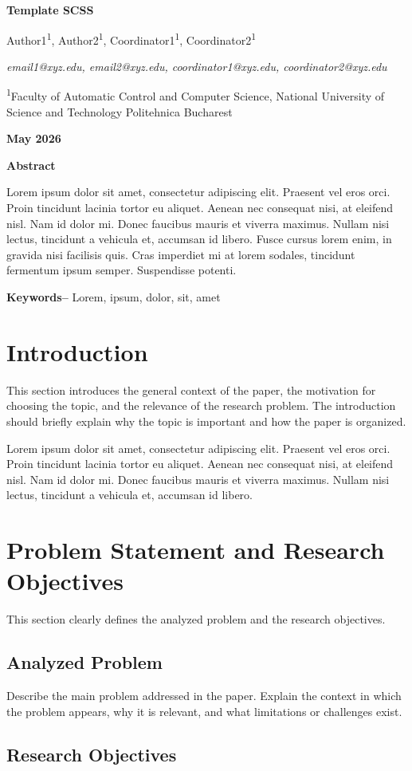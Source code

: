 \documentclass[12pt,a4paper]{article}
\makeatletter
\newcommand{\PaperTitle}{\fontsize{14pt}{21pt}\selectfont\textbf{Template SCSS}}
\newcommand{\PaperAuthors}{Author1\textsuperscript{1}, Author2\textsuperscript{1}, Coordinator1\textsuperscript{1}, Coordinator2\textsuperscript{1}}
\newcommand{\PaperEmails}{email1@xyz.edu, email2@xyz.edu, coordinator1@xyz.edu, coordinator2@xyz.edu}
\newcommand{\PaperAffiliation}{\textsuperscript{1}Faculty of Automatic Control and Computer Science, National University of Science and Technology Politehnica Bucharest}
\newcommand{\PaperDate}{\fontsize{12pt}{21pt}\selectfont\textbf{May 2026}}
\newcommand{\MakeSCSSTitle}{%
\begin{center}
    {\PaperTitle\par}
    \vspace{8pt}

    {\normalsize \PaperAuthors\par}
    \vspace{4pt}

    {\normalsize \textit{\PaperEmails}\par}
    \vspace{4pt}

    {\normalsize \PaperAffiliation\par}
    \vspace{4pt}

    {\normalsize \PaperDate\par}
\end{center}
\vspace{10pt}
}
\renewenvironment{abstract}{%
\begin{center}
    \normalsize\textbf{Abstract}
\end{center}
\itshape
}
{\par\normalfont\vspace{6pt}}
\newenvironment{keywords}
{\noindent\textbf{Keywords--}}
{\par\vspace{12pt}}
\makeatother
\begin{document}
\MakeSCSSTitle

\begin{abstract}
Lorem ipsum dolor sit amet, consectetur adipiscing elit. Praesent vel eros orci. Proin tincidunt lacinia tortor eu aliquet. Aenean nec consequat nisi, at eleifend nisl. Nam id dolor mi. Donec faucibus mauris et viverra maximus. Nullam nisi lectus, tincidunt a vehicula et, accumsan id libero. Fusce cursus lorem enim, in gravida nisi facilisis quis. Cras imperdiet mi at lorem sodales, tincidunt fermentum ipsum semper. Suspendisse potenti.
\end{abstract}

\begin{keywords}
Lorem, ipsum, dolor, sit, amet
\end{keywords}

\section{Introduction}

This section introduces the general context of the paper, the motivation for choosing the topic, and the relevance of the research problem. The introduction should briefly explain why the topic is important and how the paper is organized.

Lorem ipsum dolor sit amet, consectetur adipiscing elit. Praesent vel eros orci. Proin tincidunt lacinia tortor eu aliquet. Aenean nec consequat nisi, at eleifend nisl. Nam id dolor mi. Donec faucibus mauris et viverra maximus. Nullam nisi lectus, tincidunt a vehicula et, accumsan id libero.

\section{Problem Statement and Research Objectives}

This section clearly defines the analyzed problem and the research objectives.

\subsection{Analyzed Problem}

Describe the main problem addressed in the paper. Explain the context in which the problem appears, why it is relevant, and what limitations or challenges exist.

\subsection{Research Objectives}
\end{document}
